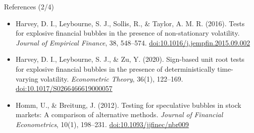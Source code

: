 \begin{frame}{References (2/4)}
\begin{itemize}
    \item Harvey, D. I., Leybourne, S. J., Sollis, R., \& Taylor, A. M. R. (2016). Tests for explosive financial bubbles in the presence of non-stationary volatility. \textit{Journal of Empirical Finance}, 38, 548--574. \href{https://doi.org/10.1016/j.jempfin.2015.09.002}{doi:10.1016/j.jempfin.2015.09.002}
    \item Harvey, D. I., Leybourne, S. J., \& Zu, Y. (2020). Sign-based unit root tests for explosive financial bubbles in the presence of deterministically time-varying volatility. \textit{Econometric Theory}, 36(1), 122--169. \href{https://doi.org/10.1017/S0266466619000057}{doi:10.1017/S0266466619000057}
    \item Homm, U., \& Breitung, J. (2012). Testing for speculative bubbles in stock markets: A comparison of alternative methods. \textit{Journal of Financial Econometrics}, 10(1), 198--231. \href{https://doi.org/10.1093/jjfinec/nbr009}{doi:10.1093/jjfinec/nbr009}
\end{itemize}
\end{frame}

